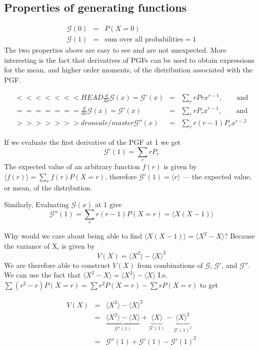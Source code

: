 \documentclass{article}
\newcommand{\calG}{\mathcal{G}}
\begin{document}
\subsection*{Properties of generating functions}
\begin{eqnarray*}
	\calG(0)&=&P(X=0)\\
	\calG(1)&=&\text{sum over all probabilities}=1
\end{eqnarray*}
The two properties above are easy to see and are not unexpected. More interesting is the fact that derivatives of PGFs can be used to obtain expressions for the mean, and higher order moments, of the distribution associated with the PGF.

\begin{eqnarray*}
<<<<<<< HEAD
	\frac{d}{dx}\calG(x)=\calG'(x)&=&\sum_r rPrx^{r-1},\qquad\text{and}\\
=======
	\frac{d}{dx}\calG(x)=\calG'(x)&=&\sum_r rP_r x^{r-1},\qquad\text{and}\\
>>>>>>> droneale/master
	\calG''(x)&=&\sum_r r(r-1)P_rx^{r-2}
\end{eqnarray*}

If we evaluate the first derivative of the PGF at 1 we get
$$\calG'(1) = \sum_r rP_r$$
The expected value of an arbitrary function $f(r)$ is given by $\langle f(r)\rangle = \sum_r f(r) P(X=r)$, therefore $\calG'(1) = \langle r\rangle$ --- the expected value, or mean, of the distribution.

Similarly,  Evaluating $\calG(x)$ at 1 give 
$$\calG''(1) = \sum_r r(r-1)P(X=r) = \langle X(X-1)\rangle$$

Why would we care about being able to find $\langle X(X-1)\rangle = \langle X^2 -X\rangle$? Because the variance of X, is given by 
$$ V(X) = \langle X^2\rangle -\langle X\rangle^2$$ We are therefore able to construct $V(X)$ from combinations of $\calG$, $\calG'$, and $\calG''$.
We can use the fact that $\langle X^2 -X\rangle =\langle X^2\rangle-\langle X\rangle$ I.e. $\sum(r^2-r)P(X=r)=\sum r^2P(X=r)-\sum rP(X=r)$ to get

\begin{eqnarray}
V(X)&=&\langle X^2\rangle - \langle X\rangle^2\\
&=&\underbrace{\langle X^2\rangle -  \langle X \rangle}_{\calG''(1)} + \underbrace{\langle X\rangle}_{\calG'(1)} - \underbrace{\langle X \rangle^2}_{\calG'(1)^2}\\
&=& \calG''(1) +\calG'(1)-\calG'(1)^2 \label{eq:binvar}
\end{eqnarray}
\end{document}
